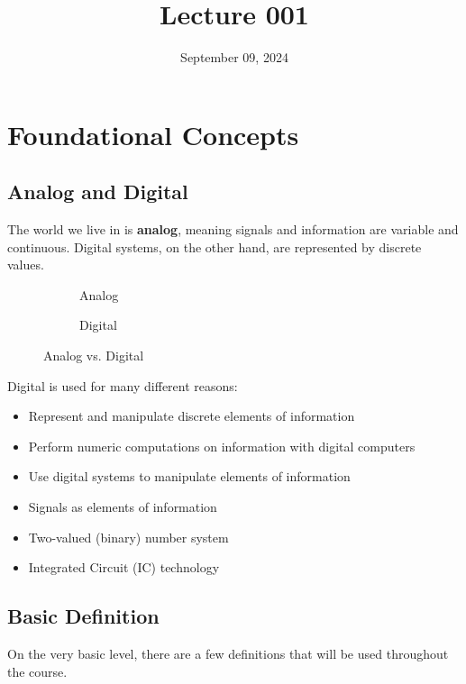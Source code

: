 \documentclass[12pt]{article}
\title{Lecture 001}
\date{September 09, 2024}
\begin{document}
\section{Foundational Concepts}
\label{sec:foundationalConcepts}

\subsection{Analog and Digital}
\label{ssec:analogAndDigital}

The world we live in is \textbf{analog}, meaning signals and information are variable and
continuous. Digital systems, on the other hand, are represented by discrete values.

\begin{figure}[H]
  \centering
  \begin{subfigure}[H]{0.45\textwidth}
    \centering
    
    \caption{Analog}
    \label{fig:001}
  \end{subfigure}
  \begin{subfigure}[H]{0.45\textwidth}
    \centering
    
    \caption{Digital}
    \label{fig:002}
  \end{subfigure}
  \caption{Analog vs. Digital}
  \label{fig:analogVsDigital}
\end{figure}

Digital is used for many different reasons:
\begin{itemize}
  \itemsep0em
  \item Represent and manipulate discrete elements of information
  \item Perform numeric computations on information with digital computers
  \item Use digital systems to manipulate elements of information
  \item Signals as elements of information
  \item Two-valued (binary) number system
  \item Integrated Circuit (IC) technology
\end{itemize}

\subsection{Basic Definition}
\label{ssec:basicDefinition}

On the very basic level, there are a few definitions that will be used throughout the course.
\end{document}
